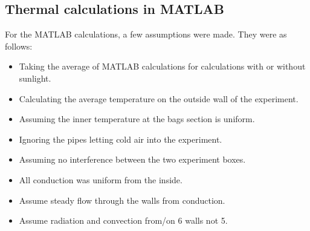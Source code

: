 

\subsection{Thermal calculations in MATLAB}
For the MATLAB calculations, a few assumptions were made. They were as follows:
\begin{itemize}
    \item Taking the average of MATLAB calculations for calculations with or without sunlight.
    \item Calculating the average temperature on the outside wall of the experiment.
    \item Assuming the inner temperature at the bags section is uniform.
    \item Ignoring the pipes letting cold air into the experiment.
    \item Assuming no interference between the two experiment boxes.
    \item All conduction was uniform from the inside.
    \item Assume steady flow through the walls from conduction.
    \item Assume radiation and convection from/on 6 walls not 5.
\end{itemize}

